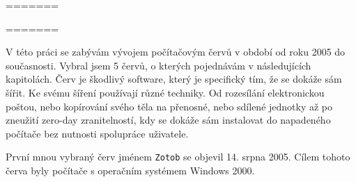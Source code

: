 \documentclass[a4paper,12pt]{article}
\begin{document}
\voffset=\evensidemargin=\oddsidemargin=\headsep=\headheight=\setlength{\parskip}{3pt}\textheight=\textwidth=

\titulnistrana
\clearpage

\voffset=\evensidemargin=\oddsidemargin=\headsep=\headheight=\setlength{\parskip}{3pt}\textheight=\textwidth=


\abstraktaklicovaslova


\clearpage
\thispagestyle{empty}


\obsah  %


\OdsazovaniOdstavcuStart %


V této práci se zabývám vývojem počítačovým červů v období od roku 2005 do současnosti. Vybral jsem 5 červů\cite{wiki-timeline}, o kterých pojednávám v následujících kapitolách. Červ je škodlivý software, který je specifický tím, že se dokáže sám šířit. Ke svému šíření používají různé techniky. Od rozesílání elektronickou poštou, nebo kopírování svého těla na přenosné, nebo sdílené jednotky až po zneužití zero-day zranitelností, kdy se dokáže sám instalovat do napadeného počítače bez nutnosti spolupráce uživatele.


První mnou vybraný červ jménem \texttt{Zotob} se objevil 14. srpna 2005\cite{wiki-timeline}\cite{zotob-schneider}. Cílem tohoto červa byly počítače s operačním systémem Windows 2000\cite{zotob-fsecure}.
\end{document}
